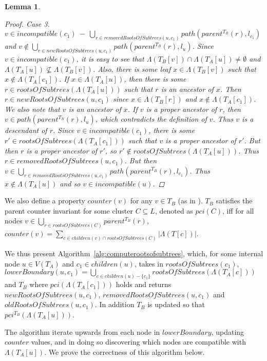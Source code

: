 \documentclass{article}
\newcommand{\leafset}{\Lambda}
\newtheorem{incompatibilityrecursive}[incompatibility]{Lemma}
\begin{document}
\begin{incompatibilityrecursive}
\begin{proof}
            \textit{Case 3.} $v \in incompatible(c_1)\ -\ \bigcup_{r \in removedRootsOfSubtrees(u, c_1)} path(parent^{T_B}(r), l_{c_1})$ and $v \not\in \bigcup_{r \in newRootsOfSubtrees(u, c_1)} path(parent^{T_B}(r), l_u)$. Since $v \in incompatible(c_1)$, it is easy to see that $\leafset(T_B[v]) \cap \leafset(T_A[u]) \neq \emptyset$ and $\leafset(T_A[u]) \not\subseteq \leafset(T_B[v])$. Also, there is some leaf $x \in \leafset(T_B[v])$ such that $x \not\in \leafset(T_A[c_1])$. If $x \in \leafset(T_A[u])$, then there is some $r \in rootsOfSubtrees(\leafset(T_A[u]))$ such that $r$ is an ancestor of $x$. Then $r \in newRootsOfSubtrees(u, c_1)$ since $x \in \leafset(T_B[r])$ and $x \not\in \leafset(T_A[c_1])$. We also note that $v$ is an ancestor of $x$. If $v$ is a proper ancestor of $r$, then $v \in path(parent^{T_B}(r), l_u)$, which contradicts the definition of $v$. Thus $v$ is a descendant of $r$. Since $v \in incompatible(c_1)$, there is some $r' \in rootsOfSubtrees(\leafset(T_A[c_1]))$ such that $v$ is a proper ancestor of $r'$. But then $r$ is a proper ancestor of $r'$, so $r' \not\in rootsOfSubtrees(\leafset(T_A[u]))$. Thus $r \in removedRootsOfSubtrees(u, c_1)$. But then $v \in \bigcup_{r \in removedRootsOfSubtrees(u, c_1)} path(parent^{T_B}(r), l_{c_1})$. Thus $x \not\in \leafset(T_A[u])$ and so $v \in incompatible(u)$.
        \end{proof}
    \end{incompatibilityrecursive}

    We also define a property $counter(v)$ for any $v \in T_B$ (as in \cite{jansson2018algorithms}). $T_B$ satisfies the parent counter invariant for some cluster $C \subseteq L$, denoted as $pci(C)$, iff for all nodes $v \in \bigcup_{r \in rootsOfSubtrees(C)} parent^{T_B}(r)$, $counter(v) = \sum_{c \in children(v) \cap rootsOfSubtrees(C)} |\leafset(T[c])|$.

    We thus present Algorithm~\ref{alg:computerootsofsubtrees}, which, for some internal node $u \in V(T_A)$ and $c_1 \in children(u)$, takes in $rootsOfSubtrees(c_1)$, $lowerBoundary(u, c_1) = \bigcup_{c \in children(u) - \{c_1\}} rootsOfSubtrees(\leafset(T_A[c]))$ and $T_B$ where $pci(\leafset(T_A[c_1]))$ holds and returns $newRootsOfSubtrees(u, c_1)$, $removedRootsOfSubtrees(u, c_1)$ and $oldRootsOfSubtrees(u, c_1)$. In addition $T_B$ is updated so that $pci^{T_B}(\leafset(T_A[u]))$.

    The algorithm iterate upwards from each node in $lowerBoundary$, updating $counter$ values, and in doing so discovering which nodes are compatible with $\leafset(T_A[u])$. We prove the correctness of this algorithm below.
\end{document}
